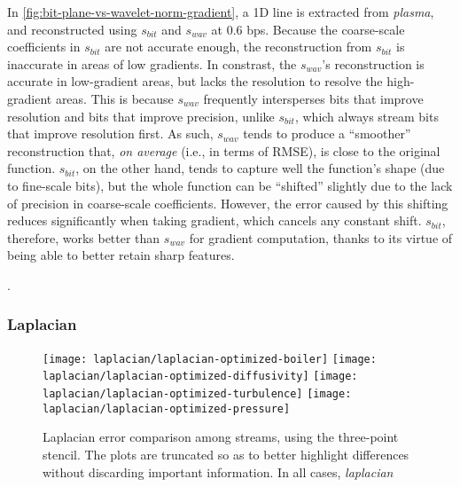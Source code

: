 In \cref{fig:bit-plane-vs-wavelet-norm-gradient}, a 1D line is extracted from \emph{plasma}, and
reconstructed using $s_{bit}$ and $s_{wav}$ at 0.6 bps. Because the coarse-scale coefficients in
$s_{bit}$ are not accurate enough, the reconstruction from $s_{bit}$ is inaccurate in areas of low
gradients. In constrast, the $s_{wav}$'s reconstruction is accurate in low-gradient areas, but lacks
the resolution to resolve the high-gradient areas. This is because $s_{wav}$ frequently intersperses
bits that improve resolution and bits that improve precision, unlike $s_{bit}$, which always stream
bits that improve resolution first. As such, $s_{wav}$ tends to produce a ``smoother''
reconstruction that, \emph{on average} (i.e., in terms of RMSE), is close to the original function.
$s_{bit}$, on the other hand, tends to capture well the function's shape (due to fine-scale bits),
but the whole function can be ``shifted'' slightly due to the lack of precision in coarse-scale
coefficients. However, the error caused by this shifting reduces significantly when taking gradient,
which cancels any constant shift. $s_{bit}$, therefore, works better than $s_{wav}$ for gradient
computation, thanks to its virtue of being able to better retain sharp features.

.

\subsubsection{Laplacian}\label{sec:laplacian}

\begin{figure}[h]
	\centering
	{\texttt{[image: laplacian/laplacian-optimized-boiler]}}
	{\texttt{[image: laplacian/laplacian-optimized-diffusivity]}}
	{\texttt{[image: laplacian/laplacian-optimized-turbulence]}}
	{\texttt{[image: laplacian/laplacian-optimized-pressure]}}
	\caption{Laplacian error comparison among streams, using the three-point stencil. The plots are
	truncated so as to better highlight differences without discarding important information. In all
	cases, \emph{laplacian}}\label{fig:laplacian-error-comparison}
\end{figure}

